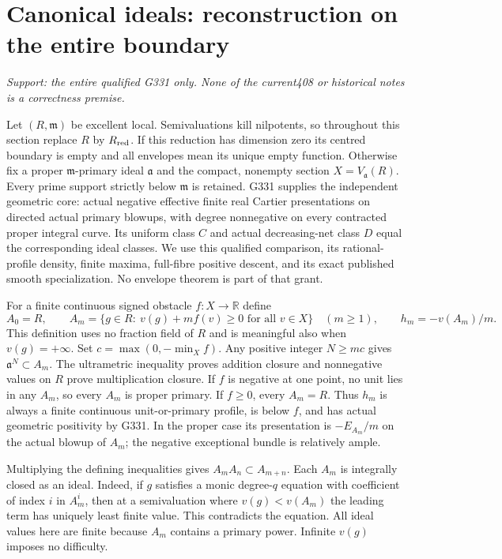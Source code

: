 \section{Canonical ideals: reconstruction on the entire boundary}
\label{sec:canonical}
\textit{Support: the entire qualified G331 only. None of the current408 or historical notes is a correctness premise.}

Let $(R,\mathfrak m)$ be excellent local. Semivaluations kill nilpotents, so throughout this section replace $R$ by $R_{\rm red}$. If this reduction has dimension zero its centred boundary is empty and all envelopes mean its unique empty function. Otherwise fix a proper $\mathfrak m$-primary ideal $\mathfrak a$ and the compact, nonempty section $X=V_{\mathfrak a}(R)$. Every prime support strictly below $\mathfrak m$ is retained. G331 supplies the independent geometric core: actual negative effective finite real Cartier presentations on directed actual primary blowups, with degree nonnegative on every contracted proper integral curve. Its uniform class $C$ and actual decreasing-net class $D$ equal the corresponding ideal classes. We use this qualified comparison, its rational-profile density, finite maxima, full-fibre positive descent, and its exact published smooth specialization. No envelope theorem is part of that grant.

For a finite continuous signed obstacle $f:X\to\mathbb R$ define
\[
 A_0=R,\qquad A_m=\{g\in R:\ v(g)+mf(v)\ge0\text{ for all }v\in X\}\quad(m\ge1),
 \qquad h_m=-v(A_m)/m.
\]
This definition uses no fraction field of $R$ and is meaningful also when $v(g)=+\infty$. Set $c=\max(0,-\min_X f)$. Any positive integer $N\ge mc$ gives $\mathfrak a^N\subset A_m$. The ultrametric inequality proves addition closure and nonnegative values on $R$ prove multiplication closure. If $f$ is negative at one point, no unit lies in any $A_m$, so every $A_m$ is proper primary. If $f\ge0$, every $A_m=R$. Thus $h_m$ is always a finite continuous unit-or-primary profile, is below $f$, and has actual geometric positivity by G331. In the proper case its presentation is $-E_{A_m}/m$ on the actual blowup of $A_m$; the negative exceptional bundle is relatively ample.

Multiplying the defining inequalities gives $A_mA_n\subset A_{m+n}$. Each $A_m$ is integrally closed as an ideal. Indeed, if $g$ satisfies a monic degree-$q$ equation with coefficient of index $i$ in $A_m^i$, then at a semivaluation where $v(g)<v(A_m)$ the leading term has uniquely least finite value. This contradicts the equation. All ideal values here are finite because $A_m$ contains a primary power. Infinite $v(g)$ imposes no difficulty.

